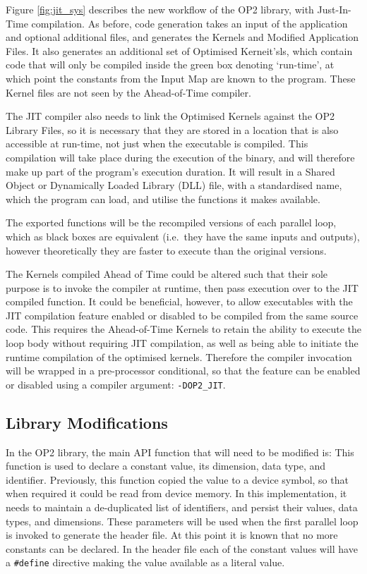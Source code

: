 \noindent Figure \ref{fig:jit_sys} describes the new workflow of the OP2 library, with Just-In-Time compilation. As before, code generation takes an input of the application and optional additional files, and generates the Kernels and Modified Application Files. It also generates an additional set of Optimised Kerneit'sls, which contain code that will only be compiled inside the green box denoting `run-time', at which point the constants from the Input Map are known to the program. These Kernel files are not seen by the Ahead-of-Time compiler.
\par
The JIT compiler also needs to link the Optimised Kernels against the OP2 Library Files, so it is necessary that they are stored in a location that is also accessible at run-time, not just when the executable is compiled. This compilation will take place during the execution of the binary, and will therefore make up part of the program's execution duration. It will result in a Shared Object or Dynamically Loaded Library (DLL) file, with a standardised name, which the program can load, and utilise the functions it makes available.
\par
The exported functions will be the recompiled versions of each parallel loop, which as black boxes are equivalent (i.e.\ they have the same inputs and outputs), however theoretically they are faster to execute than the original versions.
\par
The Kernels compiled Ahead of Time could be altered such that their sole purpose is to invoke the compiler at runtime, then pass execution over to the JIT compiled function. It could be beneficial, however, to allow executables with the JIT compilation feature enabled or disabled to be compiled from the same source code. This requires the Ahead-of-Time Kernels to retain the ability to execute the loop body without requiring JIT compilation, as well as being able to initiate the runtime compilation of the optimised kernels. Therefore the compiler invocation will be wrapped in a pre-processor conditional, so that the feature can be enabled or disabled using a compiler argument: \verb|-DOP2_JIT|.

\subsection{Library Modifications}
In the OP2 library, the main API function that will need to be modified is:
\noindent This function is used to declare a constant value, its dimension, data type, and identifier.
Previously, this function copied the value to a device symbol, so that when required it could be read from device memory. In this implementation, it needs to maintain a de-duplicated list of identifiers, and persist their values, data types, and dimensions. These parameters will be used when the first parallel loop is invoked to generate the header file. At this point it is known that no more constants can be declared. In the header file each of the constant values will have a \verb|#define| directive making the value available as a literal value.


